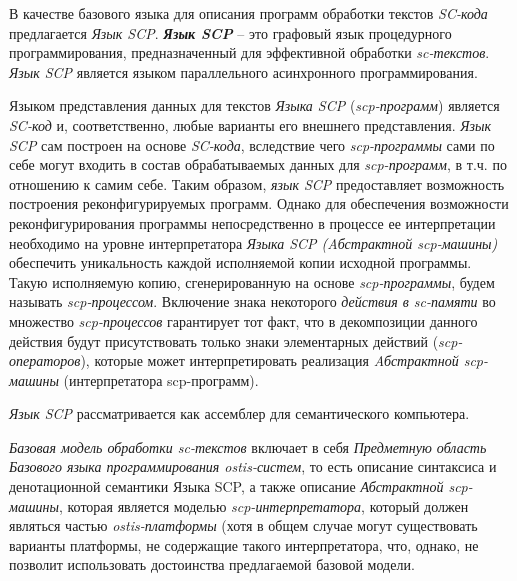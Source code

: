 В качестве базового языка для описания программ обработки текстов \textit{SC-кода} предлагается \textit{Язык SCP}. \textbf{\textit{Язык SCP}} -- это графовый язык процедурного программирования, предназначенный для эффективной обработки \textit{sc-текстов}. \textit{Язык SCP} является языком параллельного асинхронного программирования.

\begin{SCn}
\end{SCn}

Языком представления данных для текстов \textit{Языка SCP}
(\textit{scp-программ}) является \textit{SC-код} и, соответственно, любые варианты его внешнего представления. \textit{Язык SCP} сам построен на основе \textit{SC-кода}, вследствие чего \textit{scp-программы} сами по себе могут входить в состав обрабатываемых данных для \textit{scp-программ}, в т.ч. по отношению к самим себе. Таким образом, \textit{язык SCP} предоставляет возможность построения реконфигурируемых программ. Однако для обеспечения возможности реконфигурирования программы непосредственно в процессе ее интерпретации необходимо на уровне интерпретатора \textit{Языка SCP (Aбстрактной scp-машины)} обеспечить уникальность каждой исполняемой копии исходной программы. Такую исполняемую копию, сгенерированную на основе \textit{scp-программы}, будем называть \textit{scp-процессом}.
Включение знака некоторого \textit{действия в sc-памяти} во множество \textit{scp-процессов} гарантирует тот факт, что в декомпозиции данного действия будут присутствовать только знаки элементарных действий (\textit{scp-операторов}), которые может интерпретировать реализация \textit{Aбстрактной scp-машины} (интерпретатора scp-программ).

\textit{Язык SCP} рассматривается как ассемблер для семантического компьютера.

\begin{SCn}
	\begin{scnindent}
	\end{scnindent}
\end{SCn}

\textit{Базовая модель обработки sc-текстов} включает в себя \textit{Предметную область Базового языка программирования ostis-систем}, то есть описание синтаксиса и денотационной семантики Языка SCP, а также описание \textit{Абстрактной scp-машины}, которая является моделью \textit{scp-интерпретатора}, который должен являться частью \textit{ostis-платформы} (хотя в общем случае могут существовать варианты платформы, не содержащие такого интерпретатора, что, однако, не позволит использовать достоинства предлагаемой базовой модели.

